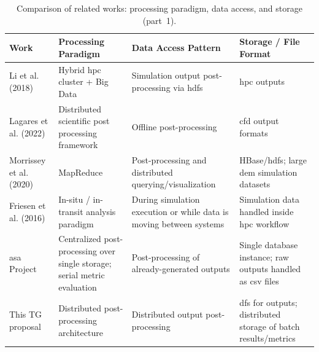 \begin{table}[htbp]
    \centering
    \caption{Comparison of related works: processing paradigm, data access, and storage (part~1).}
    \label{tab:processing_paradigms_a}
    \small
    \begin{tabularx}{\linewidth}{l >{\raggedright\arraybackslash}X >{\raggedright\arraybackslash}X >{\raggedright\arraybackslash}X}
        \toprule
        Work & Processing Paradigm & Data Access Pattern & Storage / File Format \\
        \midrule
        Li et al. (2018) & Hybrid \gls{hpc} cluster + Big Data & Simulation output post-processing via \gls{hdfs} & \gls{hpc} outputs \\
        \addlinespace
        Lagares et al. (2022) & Distributed scientific post processing framework & Offline post-processing & \gls{cfd} output formats \\
        \addlinespace
        Morrissey et al. (2020) & MapReduce & Post-processing and distributed querying/visualization & HBase/\gls{hdfs}; large \gls{dem} simulation datasets \\
        \addlinespace
        Friesen et al. (2016) & In-situ / in-transit analysis paradigm & During simulation execution or while data is moving between systems & Simulation data handled inside \gls{hpc} workflow \\
        \addlinespace
        \gls{asa} Project & Centralized post-processing over single storage; serial metric evaluation & Post-processing of already-generated outputs & Single database instance; raw outputs handled as csv files \\
        \addlinespace
        This TG proposal & Distributed post-processing architecture & Distributed output post-processing & \gls{dfs} for outputs; distributed storage of batch results/metrics \\
        \bottomrule
    \end{tabularx}
\end{table}

